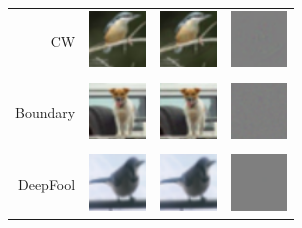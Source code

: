 \documentclass{article}
\begin{document}
\begin{figure}[h]
	\centering
	\begin{tabular}{rlll} 
		CW & \includegraphics[height=1.5cm, align=c]{../figures/carlini_wagner_orig.pdf} & \includegraphics[height=1.5cm, align=c]{../figures/carlini_wagner_adversarial.pdf} & \includegraphics[height=1.5cm, align=c]{../figures/carlini_wagner_diff.pdf}\\
		\\
		Boundary & \includegraphics[height=1.5cm, align=c]{../figures/boundary_orig.pdf} & \includegraphics[height=1.5cm, align=c]{../figures/boundary_adversarial.pdf} & \includegraphics[height=1.5cm, align=c]{../figures/boundary_diff.pdf}\\
		\\
		DeepFool & \includegraphics[height=1.5cm, align=c]{../figures/deepfool_orig.pdf} & \includegraphics[height=1.5cm, align=c]{../figures/deepfool_adversarial.pdf} & \includegraphics[height=1.5cm, align=c]{../figures/deepfool_diff.pdf}\\

\end{tabular}
\end{figure}
\end{document}
